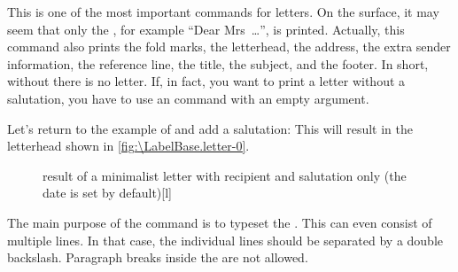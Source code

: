 \begin{Declaration}
\end{Declaration}
This is one of the most important commands for letters. On the surface, it may
seem that only the , for example
``Dear Mrs~\dots'', is printed. Actually, this command
also prints the fold marks, the
letterhead, the address, the extra sender
information, the reference line, the title,
the subject, and the footer. In short,
without  there is no letter. If, in fact, you want to print a
letter without a salutation, you have to use an  command with
an empty argument.

\begin{Example}
  Let's return to the example of
   and add a salutation:
  This will result in the letterhead shown in
  \autoref{fig:\LabelBase.letter-0}.
  \begin{figure}
    \setcapindent{0pt}%
    \begin{captionbeside}{%
        result of a minimalist letter with recipient and salutation only 
        (the date is set by default)}[l]
    \end{captionbeside}
    \label{fig:\LabelBase.letter-0}
  \end{figure}
\end{Example}
\iffalse%
\begin{Explain}
  In the early days of computer-generated letters, a salutation was normally
  omitted, since individualised form letters were hardly possible. Today
  personalised greetings are common in in mass mailings.%
\end{Explain}
\fi
%
\EndIndexGroup


\begin{Declaration}
\end{Declaration}
The main purpose of the command  is to typeset the
. This can even consist of multiple
lines. In that case, the individual lines should be separated by a double
backslash. Paragraph breaks inside the  are not
allowed.

